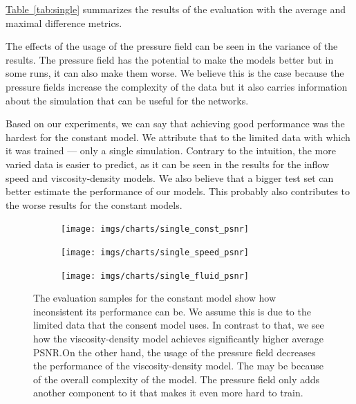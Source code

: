 \documentclass{llncs}
\newcommand{\reftab}[1]{\hyperref[#1]{Table~\ref*{#1}}}
\begin{document}
\reftab{tab:single} summarizes the results of the evaluation with the average and maximal difference metrics.

The effects of the usage of the pressure field can be seen in the variance of the results. The pressure field has the potential to make the models better but in some runs, it can also make them worse. We believe this is the case because the pressure fields increase the complexity of the data but it also carries information about the simulation that can be useful for the networks.

Based on our experiments, we can say that achieving good performance was the hardest for the constant model. We attribute that to the limited data with which it was trained --- only a single simulation. Contrary to the intuition, the more varied data is easier to predict, as it can be seen in the results for the inflow speed and viscosity-density models. We also believe that a bigger test set can better estimate the performance of our models. This probably also contributes to the worse results for the constant models.

\begin{figure}
  \begin{subfigure}{.3\textwidth}
    \centering
    \texttt{[image: imgs/charts/single\_const\_psnr]}
  \end{subfigure}
  \begin{subfigure}{.3\textwidth}
    \centering
    \texttt{[image: imgs/charts/single\_speed\_psnr]}
  \end{subfigure}
  \begin{subfigure}{.3\textwidth}
    \centering
    \texttt{[image: imgs/charts/single\_fluid\_psnr]}
  \end{subfigure}
  \caption{The evaluation samples for the constant model show how inconsistent its performance can be. We assume this is due to the limited data that the consent model uses. In contrast to that, we see how the viscosity-density model achieves significantly higher average PSNR.\@ On the other hand, the usage of the pressure field decreases the performance of the viscosity-density model. The may be because of the overall complexity of the model. The pressure field only adds another component to it that makes it even more hard to train.}\label{fig:single_psnr}
\end{figure}
\end{document}
